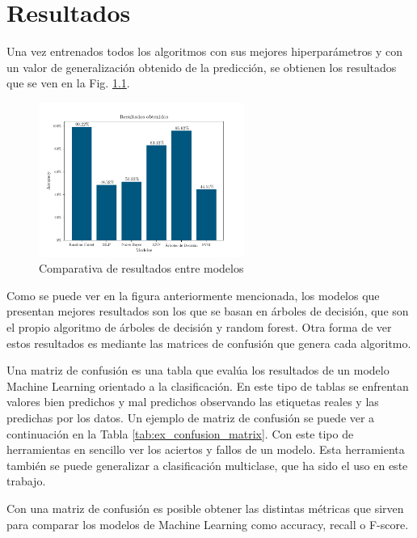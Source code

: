 
\chapter{Resultados} \label{chap:result}

Una vez entrenados todos los algoritmos con sus mejores hiperparámetros y con un valor de generalización obtenido de la predicción, se obtienen los resultados que se ven en la Fig. \ref{fig:comp_accur}.

\begin{figure}
    \centering
    \includegraphics[width=0.6\textwidth]{../Python/plots/parallel/accur_results}
    \caption{Comparativa de resultados entre modelos}
    \label{fig:comp_accur}
\end{figure}

Como se puede ver en la figura anteriormente mencionada, los modelos que presentan mejores resultados son los que se basan en árboles de decisión, que son el propio algoritmo de árboles de decisión y random forest. Otra forma de ver estos resultados es mediante las matrices de confusión que genera cada algoritmo.

Una matriz de confusión es una tabla que evalúa los resultados de un modelo Machine Learning orientado a la clasificación. En este tipo de tablas se enfrentan valores bien predichos y mal predichos observando las etiquetas reales y las predichas por los datos. Un ejemplo de matriz de confusión se puede ver a continuación en la Tabla \ref{tab:ex_confusion_matrix}. Con este tipo de herramientas en sencillo ver los aciertos y fallos de un modelo. Esta herramienta también se puede generalizar a clasificación multiclase, que ha sido el uso en este trabajo.

Con una matriz de confusión es posible obtener las distintas métricas que sirven para comparar los modelos de Machine Learning como accuracy, recall o F-score.

